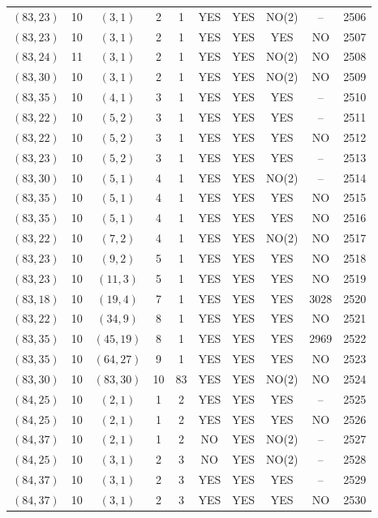 \begin{longtable}{|c|c|c|c|c|c|c|c|c|c|}
$(83, 23)$ & 10 & $(3, 1)$ & 2 & 1 & YES & YES & NO(2) & -- & 2506\\
$(83, 23)$ & 10 & $(3, 1)$ & 2 & 1 & YES & YES & YES & NO & 2507\\
$(83, 24)$ & 11 & $(3, 1)$ & 2 & 1 & YES & YES & NO(2) & NO & 2508\\
$(83, 30)$ & 10 & $(3, 1)$ & 2 & 1 & YES & YES & NO(2) & NO & 2509\\
$(83, 35)$ & 10 & $(4, 1)$ & 3 & 1 & YES & YES & YES & -- & 2510\\
$(83, 22)$ & 10 & $(5, 2)$ & 3 & 1 & YES & YES & YES & -- & 2511\\
$(83, 22)$ & 10 & $(5, 2)$ & 3 & 1 & YES & YES & YES & NO & 2512\\
$(83, 23)$ & 10 & $(5, 2)$ & 3 & 1 & YES & YES & YES & -- & 2513\\
$(83, 30)$ & 10 & $(5, 1)$ & 4 & 1 & YES & YES & NO(2) & -- & 2514\\
$(83, 35)$ & 10 & $(5, 1)$ & 4 & 1 & YES & YES & YES & NO & 2515\\
$(83, 35)$ & 10 & $(5, 1)$ & 4 & 1 & YES & YES & YES & NO & 2516\\
$(83, 22)$ & 10 & $(7, 2)$ & 4 & 1 & YES & YES & NO(2) & NO & 2517\\
$(83, 23)$ & 10 & $(9, 2)$ & 5 & 1 & YES & YES & YES & NO & 2518\\
$(83, 23)$ & 10 & $(11, 3)$ & 5 & 1 & YES & YES & YES & NO & 2519\\
$(83, 18)$ & 10 & $(19, 4)$ & 7 & 1 & YES & YES & YES & 3028 & 2520\\
$(83, 22)$ & 10 & $(34, 9)$ & 8 & 1 & YES & YES & YES & NO & 2521\\
$(83, 35)$ & 10 & $(45, 19)$ & 8 & 1 & YES & YES & YES & 2969 & 2522\\
$(83, 35)$ & 10 & $(64, 27)$ & 9 & 1 & YES & YES & YES & NO & 2523\\
$(83, 30)$ & 10 & $(83, 30)$ & 10 & 83 & YES & YES & NO(2) & NO & 2524\\
$(84, 25)$ & 10 & $(2, 1)$ & 1 & 2 & YES & YES & YES & -- & 2525\\
$(84, 25)$ & 10 & $(2, 1)$ & 1 & 2 & YES & YES & YES & NO & 2526\\
$(84, 37)$ & 10 & $(2, 1)$ & 1 & 2 & NO & YES & NO(2) & -- & 2527\\
$(84, 25)$ & 10 & $(3, 1)$ & 2 & 3 & NO & YES & NO(2) & -- & 2528\\
$(84, 37)$ & 10 & $(3, 1)$ & 2 & 3 & YES & YES & YES & -- & 2529\\
$(84, 37)$ & 10 & $(3, 1)$ & 2 & 3 & YES & YES & YES & NO & 2530\\

\end{longtable}
